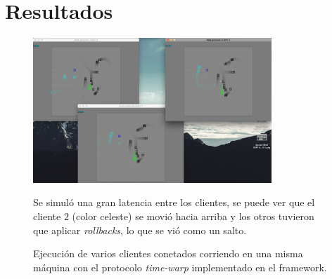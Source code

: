\section{Resultados}

\begin{figure}[h]
\centering
\includegraphics[width=0.8\textwidth]{run}
\caption{\label{fig:execution} \small Ejecución de varios clientes conetados corriendo en una misma máquina con el protocolo \emph{time-warp} implementado en el framework.} Se simuló una gran latencia entre los clientes, se puede ver que el cliente $2$ (color celeste) se movió hacia arriba y los otros tuvieron que aplicar \emph{rollbacks}, lo que se vió como un salto.
\end{figure}


